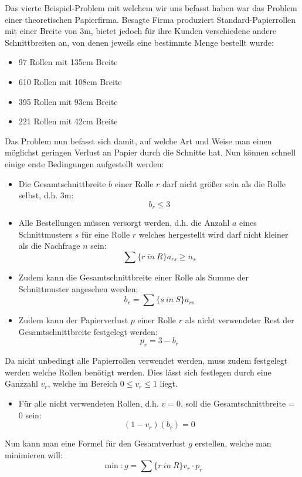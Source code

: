 Das vierte Beispiel-Problem mit welchem wir uns befasst haben war das Problem einer theoretischen Papierfirma. Besagte Firma produziert Standard-Papierrollen mit einer Breite von 3m, bietet jedoch für ihre Kunden verschiedene andere Schnittbreiten an, von denen jeweils eine bestimmte Menge bestellt wurde:
\begin{itemize}
\item 97 Rollen mit 135cm Breite
\item 610  Rollen mit 108cm Breite
\item 395  Rollen mit 93cm Breite
\item 221  Rollen mit 42cm Breite
\end{itemize}

Das Problem nun befasst sich damit, auf welche Art und Weise man einen möglichst geringen Verlust an Papier durch die Schnitte hat.
Nun können schnell einige erste Bedingungen aufgestellt werden:

\begin{itemize}
\item Die Gesamtschnittbreite $b$ einer Rolle $r$ darf nicht größer sein als die Rolle selbst, d.h. 3m: 
\[ b_r \leq 3 \]
\item Alle Bestellungen müssen versorgt werden, d.h. die Anzahl $a$ eines Schnittmusters $s$ für eine Rolle $r$ welches hergestellt wird darf nicht kleiner als die Nachfrage $n$ sein:
\[ \sum\{r~in~R\} a_{rs} \geq n_{s} \]
\item Zudem kann die Gesamtschnittbreite einer Rolle als Summe der Schnittmuster angesehen werden:
\[ b_r = \sum\{s~in~S\}a_{rs} \]
\item Zudem kann der Papierverlust $p$ einer Rolle $r$ als nicht verwendeter Rest der Gesamtschnittbreite festgelegt werden:
\[ p_r = 3 - b_r \]
\end{itemize}

Da nicht unbedingt alle Papierrollen verwendet werden, muss zudem festgelegt werden welche Rollen benötigt werden. Dies lässt sich festlegen durch eine Ganzzahl $v_r$, welche im Bereich $0 \leq v_r \leq 1$ liegt.

\begin{itemize}
\item Für alle nicht verwendeten Rollen, d.h. $v = 0$, soll die Gesamtschnittbreite = 0 sein:
\[ (1 - v_r)(b_r) = 0 \]
\end{itemize}

Nun kann man eine Formel für den Gesamtverlust $g$ erstellen, welche man minimieren will:
\[\min: g = \sum\{r~in~R\}v_r \cdot p_r\]